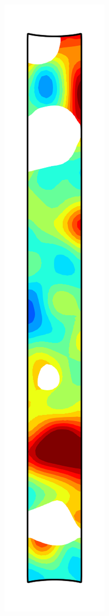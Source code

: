 \begin{figure}[!htb]
\begin{subfigure}{0.08\textwidth}
  \end{subfigure}
  \begin{subfigure}{0.08\textwidth}
    \centering
    \includegraphics[width=\textwidth]{Chapter5/figures/spallation/psie_10}

\end{subfigure}
\end{figure}
